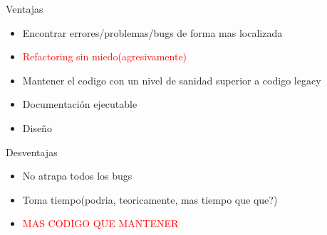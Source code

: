 \begin{frame}{Ventajas}
    \begin{itemize}
        \item Encontrar errores/problemas/bugs de forma mas localizada
        \item \textcolor{red}{Refactoring sin miedo(agresivamente)}
        \item Mantener el codigo con un nivel de sanidad superior a codigo legacy
        \item Documentación ejecutable
        \item Diseño
    \end{itemize}
\end{frame}

\begin{frame}{Desventajas}
    \begin{itemize}
        \item No atrapa todos los bugs
        \item Toma tiempo(podria, teoricamente, mas tiempo que que?)
        \item \textcolor{red}{MAS CODIGO QUE MANTENER}
    \end{itemize}
\end{frame}


